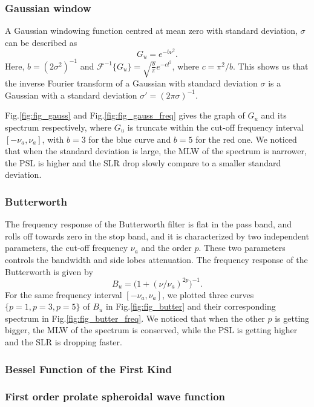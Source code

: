 \documentclass[useAMS,usenatbib]{mn2e}
\begin{document}
\subsubsection{Gaussian window}
A Gaussian windowing function centred at mean zero with standard deviation, $\sigma$ can be described as 
\begin{equation}
  G_{u}= e^{-b\nu^{2}}.
\end{equation}
Here, $b=(2\sigma^2)^{-1}$ and  $\mathcal{F}^{-1}\big\{G_{u}\big\}=\sqrt{\frac{b}{\pi}}e^{-cl^2}$, where $c=\pi^2/b$.
This shows us that the inverse Fourier transform of a Gaussian with standard deviation $\sigma$ is a Gaussian with a standard 
deviation $\sigma '= (2\pi\sigma)^{-1}$. 

Fig.\ref{fig:fig_gauss} and Fig.\ref{fig:fig_gauss_freq} gives the graph of $G_{u}$ and its spectrum respectively, where $G_{u}$ 
is truncate within the cut-off frequency interval $[-\nu_a,\nu_a]$, with $b = 3$ for the blue curve and $b=5$ for the red one. We noticed 
that when the standard deviation is large, the MLW of the spectrum is narrower, the PSL is higher and the SLR drop slowly compare to a 
smaller standard deviation.
\subsubsection{Butterworth}
The frequency response of the Butterworth filter is flat  in the pass band, and rolls off towards zero in the stop band, and it is 
characterized by two independent parameters, the cut-off frequency 
$\nu_a$ and the order $p$. These two parameters controls the 
bandwidth and side lobes  attenuation. The frequency response of the Butterworth is given by 
\begin{equation}
B_u= \Big(1 + (\nu/\nu_a)^{2p}\Big)^{-1}.
\end{equation}
For the same frequency interval $[-\nu_a,\nu_a]$, we plotted  three curves $\{p=1, p=3, p=5\}$ of $B_{u}$ in Fig.\ref{fig:fig_butter} and 
their corresponding spectrum in Fig.\ref{fig:fig_butter_freq}.  We noticed 
that when the other $p$ is getting bigger, the MLW of the spectrum is conserved, while the PSL is getting higher and the SLR is 
dropping  faster.
\subsubsection{Bessel Function of the First Kind}
\subsubsection{First order prolate spheroidal wave function}
\end{document}
